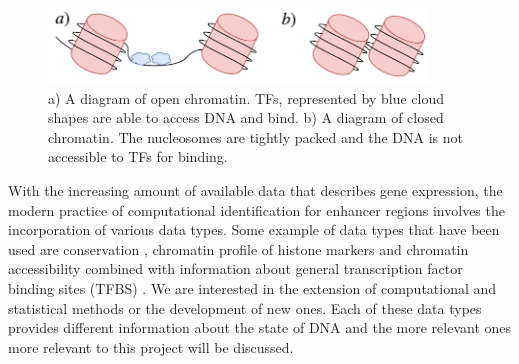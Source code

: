         \begin{figure}[H]
            \centering
            \includegraphics[width=0.9\textwidth]{OpenCloseChromatin.pdf}
            \caption{a) A diagram of open chromatin. TFs, represented by blue cloud shapes are able to access DNA and bind. b) A diagram of closed chromatin. The nucleosomes are tightly packed and the DNA is not accessible to TFs for binding.}
            \label{fig:openclose}
        \end{figure}
        
         With the increasing amount of available data that describes gene expression, the modern practice of computational identification for enhancer regions involves the incorporation of various data types. Some example of data types that have been used are conservation \cite{visel2007enhancer}, chromatin profile of histone markers \cite{won2010genome} and chromatin accessibility combined with information about general transcription factor binding sites (TFBS) \cite{boyle2010high}. We are interested in the extension of computational and statistical methods or the development of new ones. Each of these data types provides different information about the state of DNA and the more relevant ones more relevant to this project will be discussed. 

        


        
        
        
